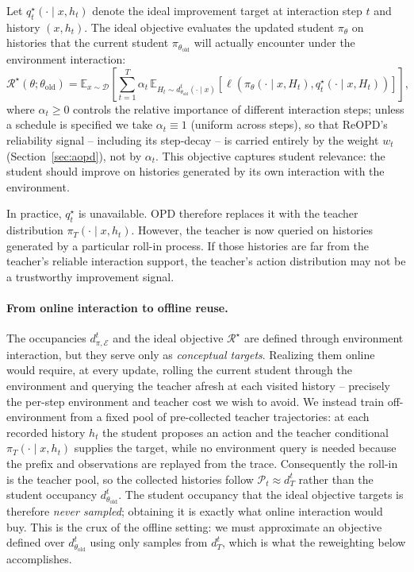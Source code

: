 Let \(q_t^\star(\cdot\mid x,h_t)\) denote the ideal improvement target at interaction
step \(t\) and history \((x,h_t)\). The ideal objective evaluates the updated student
\(\pi_\theta\) on histories that the current student \(\pi_{\theta_{\mathrm{old}}}\)
will actually encounter under the environment interaction:
\begin{equation}
\label{eq:ideal}
\mathcal R^\star(\theta;\theta_{\mathrm{old}})
=
\mathbb E_{x\sim\mathcal D}
\left[
\sum_{t=1}^{T}
\alpha_t\,
\mathbb E_{H_t\sim d_{\theta_{\mathrm{old}}}^{t}(\cdot\mid x)}
\left[
\ell\left(
\pi_\theta(\cdot\mid x,H_t),
q_t^\star(\cdot\mid x,H_t)
\right)
\right]
\right],
\end{equation}
where \(\alpha_t\ge 0\) controls the relative importance of different
interaction steps; unless a schedule is specified we take \(\alpha_t\equiv 1\)
(uniform across steps), so that ReOPD's reliability signal -- including its step-decay --
is carried entirely by the weight \(w_t\) (Section~\ref{sec:aopd}), not by
\(\alpha_t\). This objective captures student relevance: the student should
improve on histories generated by its own interaction with the environment.

In practice, \(q_t^\star\) is unavailable. OPD therefore replaces it with the
teacher distribution \(\pi_T(\cdot\mid x,h_t)\). However, the teacher is now
queried on histories generated by a particular roll-in process. If those
histories are far from the teacher's reliable interaction support, the teacher's
action distribution may not be a trustworthy improvement signal.

\paragraph{From online interaction to offline reuse.}

The occupancies \(d_{\pi,\mathcal E}^{t}\) and the ideal objective
\(\mathcal R^\star\) are defined through environment interaction, but they serve
only as \emph{conceptual targets}. Realizing them online would require, at every
update, rolling the current student through the environment and querying the
teacher afresh at each visited history -- precisely the per-step environment and
teacher cost we wish to avoid. We instead train off-environment from a fixed pool
of pre-collected teacher trajectories: at each recorded history \(h_t\) the
student proposes an action and the teacher conditional
\(\pi_T(\cdot\mid x,h_t)\) supplies the target, while no environment query is
needed because the prefix and observations are replayed from the trace.
Consequently the roll-in is the teacher pool, so the collected histories
follow \(\mathcal P_t\approx d_T^{t}\) rather than the student occupancy
\(d_{\theta_{\mathrm{old}}}^{t}\). The student occupancy that the ideal objective
targets is therefore \emph{never sampled}; obtaining it is exactly what
online interaction would buy. This is the crux of the offline setting: we must
approximate an objective defined over \(d_{\theta_{\mathrm{old}}}^{t}\) using
only samples from \(d_T^{t}\), which is what the reweighting below accomplishes.

